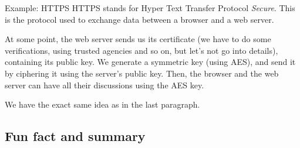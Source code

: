 \documentclass[a4paper]{article}
\begin{document}
\begin{parag}{Example: HTTPS}
    HTTPS stands for Hyper Text Transfer Protocol \textit{Secure}. This is the protocol used to exchange data between a browser and a web server. 

    At some point, the web server sends us its certificate (we have to do some verifications, using trusted agencies and so on, but let's not go into details), containing its public key. We generate a symmetric key (using AES), and send it by ciphering it using the server's public key. Then, the browser and the web server can have all their discussions using the AES key. 

    We have the exact same idea as in the last paragraph.
\end{parag}

\subsection{Fun fact and summary}
\end{document}
